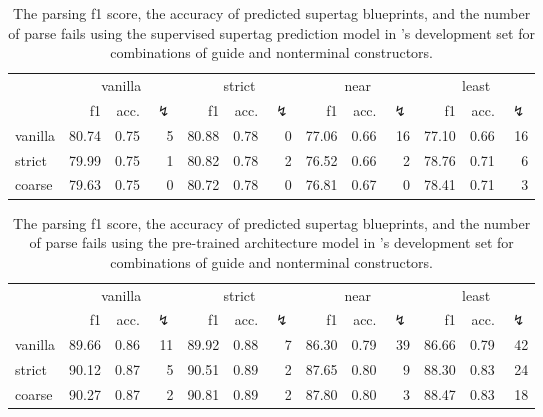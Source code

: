 \documentclass[../../document.tex]{subfiles}
\begin{document}
    \begin{table}
        \caption{\label{tbl:gridsearch:1:2}
            The parsing f1 score, the accuracy of predicted supertag blueprints, and the number of parse fails using the supervised supertag prediction model in \negra{}'s development set for combinations of guide and nonterminal constructors.
        }
        \centering
        \vspace{.2cm}
        \begin{tabular}{l|rrr|rrr|rrr|rrr}
            \toprule
                        & \multicolumn{3}{c|}{vanilla} & \multicolumn{3}{c|}{strict} & \multicolumn{3}{c|}{near} & \multicolumn{3}{c}{least}  \\
                        & f1 & acc. & $\lightning$ & f1 & acc. & $\lightning$ & f1 & acc. & $\lightning$ & f1 & acc. & $\lightning$  \\ \hline
            vanilla     & 80.74 & 0.75 & 5 & 80.88 & 0.78 & 0 & 77.06 & 0.66 & 16 & 77.10 & 0.66 & 16 \\
            strict      & 79.99 & 0.75 & 1 & 80.82 & 0.78 & 2 & 76.52 & 0.66 &  2 & 78.76 & 0.71 &  6 \\
            coarse      & 79.63 & 0.75 & 0 & 80.72 & 0.78 & 0 & 76.81 & 0.67 &  0 & 78.41 & 0.71 &  3 \\
            \bottomrule
        \end{tabular}
    \end{table}


    \begin{table}
        \caption{\label{tbl:gridsearch:1:3}
            The parsing f1 score, the accuracy of predicted supertag blueprints, and the number of parse fails using the pre-trained architecture model in \negra{}'s development set for combinations of guide and nonterminal constructors.
        }
        \centering
        \vspace{.2cm}
        \begin{tabular}{l|rrr|rrr|rrr|rrr}
            \toprule
                        & \multicolumn{3}{c|}{vanilla} & \multicolumn{3}{c|}{strict} & \multicolumn{3}{c|}{near} & \multicolumn{3}{c}{least}  \\
                        & f1 & acc. & $\lightning$ & f1 & acc. & $\lightning$ & f1 & acc. & $\lightning$ & f1 & acc. & $\lightning$  \\ \hline
            vanilla     & 89.66 & 0.86 & 11 & 89.92 & 0.88 & 7 & 86.30 & 0.79 & 39 & 86.66 & 0.79 & 42 \\
            strict      & 90.12 & 0.87 &  5 & 90.51 & 0.89 & 2 & 87.65 & 0.80 &  9 & 88.30 & 0.83 & 24 \\
            coarse      & 90.27 & 0.87 &  2 & 90.81 & 0.89 & 2 & 87.80 & 0.80 &  3 & 88.47 & 0.83 & 18 \\
            \bottomrule
        \end{tabular}
    \end{table}
\end{document}
